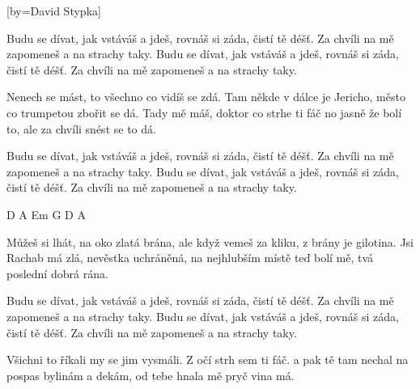 [by={David Stypka}]

\beginchorus{}
Budu se dívat, jak vstáváš a jdeš,
rovnáš si záda, čistí tě déšť.
Za chvíli na mě zapomeneš a na strachy taky.
Budu se dívat, jak vstáváš a jdeš,
rovnáš si záda, čistí tě déšť.
Za chvíli na mě zapomeneš a na strachy taky.
\endchorus{}

\beginverse{}
Nenech se mást, to všechno co vidíš se zdá.
Tam někde v dálce je Jericho, město co trumpetou zbořit se dá.
Tady mě máš, doktor co strhe ti fáč
no jasně že bolí to, ale za chvíli snést se to dá.
\endverse{}

\repeatingchorus{}
\beginchorus{}
\chordsoff{}
Budu se dívat, jak vstáváš a jdeš,
rovnáš si záda, čistí tě déšť.
Za chvíli na mě zapomeneš a na strachy taky.
Budu se dívat, jak vstáváš a jdeš,
rovnáš si záda, čistí tě déšť.
Za chvíli na mě zapomeneš a na strachy taky.
\chordson{}
\endchorus{}

\beginverse*{}
D A Em G D A
\endverse{}

\beginverse{}
\chordsoff{}
Můžeš si lhát, na oko zlatá brána,
ale když vemeš za kliku, z brány je gilotina.
Jsi Rachab má zlá, nevěstka uchráněná,
na nejhlubším místě teď bolí mě, tvá poslední dobrá rána.
\chordson{}
\endverse{}

\repeatingchorus{}
\beginchorus{}
\chordsoff{}
Budu se dívat, jak vstáváš a jdeš,
rovnáš si záda, čistí tě déšť.
Za chvíli na mě zapomeneš a na strachy taky.
Budu se dívat, jak vstáváš a jdeš,
rovnáš si záda, čistí tě déšť.
Za chvíli na mě zapomeneš a na strachy taky.
\chordson{}
\endchorus{}

\beginverse{}
\chordsoff{}
Všichni to říkali my se jim vysmáli.
Z očí strh sem ti fáč.
a pak tě tam nechal na pospas bylinám a dekám,
od tebe hnala mě pryč vina má.
\chordson{}
\endverse{}

